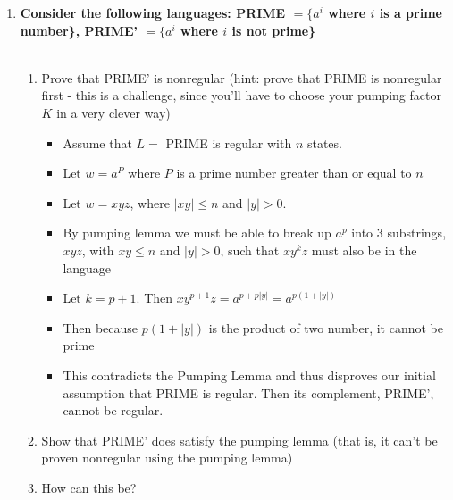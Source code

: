 \begin{enumerate}
\newpage
\item \textbf{
	Consider the following languages: PRIME 
	$= \{a^i$ where $i$ is a prime number\},
    PRIME' $ = \{a^i$ where $i$ is not prime\}
}
\\\\
\begin{enumerate}
	\item Prove that PRIME' is nonregular (hint: prove that PRIME is nonregular first - this is a challenge, since you'll have to choose your pumping factor $K$ in a very clever way)
	\begin{itemize}
		\item 	Assume that $L = $ PRIME is regular with $n$ states.  	
		\item Let $w = a^P$ where $P$ is a prime number greater than or equal to $n$
		
		\item Let $w = xyz$, where $|xy| \leq n$ and $|y| > 0$.
		
		\item By pumping lemma we must be able to break up $a^p$ into 3 substrings, $xyz$, with $xy \leq n$ and $|y| > 0$, such that $xy^kz$ must also be in the language
		
		\item Let $k = p+1$. Then $xy^{p+1}z = a^{p+p|y|} = a^{p(1 + |y|)}$
		
		\item Then because $p(1 + |y|)$ is the product of two number, it cannot be prime
		
		\item This contradicts the Pumping Lemma and thus disproves our initial assumption that PRIME is regular.  Then its complement, PRIME', cannot be regular.
		
	\end{itemize}
	
	\item Show that PRIME' does satisfy the pumping lemma (that is, it can't be proven nonregular using the pumping lemma)
	
	\item How can this be?
	
\end{enumerate}

\end{enumerate}


